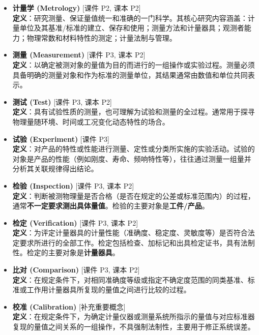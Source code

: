 \documentclass[11pt,a4paper]{ctexart}
\begin{document}
\begin{itemize}[leftmargin=1.5em, itemsep=4pt]
    \item \textbf{计量学 (Metrology)} \hfill\textsf{[课件 P2, 课本 P2]} \\
    \textbf{定义}：研究测量、保证量值统一和准确的一门科学。其核心研究内容涵盖：计量单位及其基准/标准的建立、保存和使用；测量方法和计量器具；观测者能力；物理常数和材料特性的测定；计量法制与管理。
    
    \item \textbf{测量 (Measurement)} \hfill\textsf{[课件 P3, 课本 P2]} \\
    \textbf{定义}：以确定被测对象的量值为目的而进行的一组操作或实验过程。测量必须具备明确的测量对象和作为标准的测量单位，其结果通常由数值和单位共同表示。
    
    \item \textbf{测试 (Test)} \hfill\textsf{[课件 P3, 课本 P2]} \\
    \textbf{定义}：具有试验性质的测量，也可理解为试验和测量的全过程。通常用于探寻物理量随环境、时间或工况变化动态特性的场合。
    
    \item \textbf{试验 (Experiment)} \hfill\textsf{[课件 P3]} \\
    \textbf{定义}：对产品的特性或性能进行测量、定性或分类所实施的实验活动。试验的对象是产品的性能（例如刚度、寿命、频响特性等），往往通过测量一组量并分析其关联规律得出结论。
    
    \item \textbf{检验 (Inspection)} \hfill\textsf{[课件 P3, 课本 P2]} \\
    \textbf{定义}：判断被测物理量是否合格（是否在规定的公差或标准范围内）的过程，通常\textbf{不一定要求测出具体量值}。检验的主要对象是\textbf{工件/产品}。
    
    \item \textbf{检定 (Verification)} \hfill\textsf{[课件 P3, 课本 P2]} \\
    \textbf{定义}：为评定计量器具的计量性能（准确度、稳定度、灵敏度等）是否符合法定要求所进行的全部工作。检定包括检查、加标记和出具检定证书，具有法制性。检定的主要对象是\textbf{计量器具}。
    
    \item \textbf{比对 (Comparison)} \hfill\textsf{[课件 P3, 课本 P2]} \\
    \textbf{定义}：在规定条件下，对相同准确度等级或指定不确定度范围的同类基准、标准或工作用计量器具所复现的量值之间进行比较的过程。
    
    \item \textbf{校准 (Calibration)} \hfill\textsf{[补充重要概念]} \\
    \textbf{定义}：在规定条件下，为确定计量仪器或测量系统所指示的量值与对应标准器复现的量值之间关系的一组操作，不具强制法制性，主要用于修正系统误差。
\end{itemize}
\end{document}

